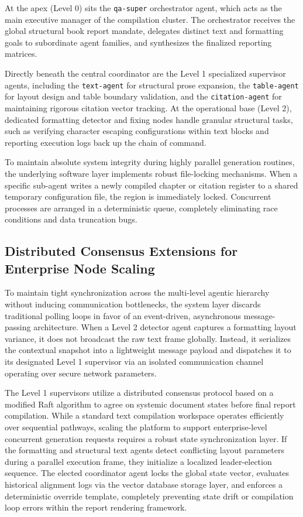 At the apex (Level 0) sits the \texttt{qa-super} orchestrator agent, which acts as the main executive manager of the compilation cluster. The orchestrator receives the global structural book report mandate, delegates distinct text and formatting goals to subordinate agent families, and synthesizes the finalized reporting matrices. 

Directly beneath the central coordinator are the Level 1 specialized supervisor agents, including the \texttt{text-agent} for structural prose expansion, the \texttt{table-agent} for layout design and table boundary validation, and the \texttt{citation-agent} for maintaining rigorous citation vector tracking. At the operational base (Level 2), dedicated formatting detector and fixing nodes handle granular structural tasks, such as verifying character escaping configurations within text blocks and reporting execution logs back up the chain of command.

To maintain absolute system integrity during highly parallel generation routines, the underlying software layer implements robust file-locking mechanisms. When a specific sub-agent writes a newly compiled chapter or citation register to a shared temporary configuration file, the region is immediately locked. Concurrent processes are arranged in a deterministic queue, completely eliminating race conditions and data truncation bugs.

\subsection{Distributed Consensus Extensions for Enterprise Node Scaling}
To maintain tight synchronization across the multi-level agentic hierarchy without inducing communication bottlenecks, the system layer discards traditional polling loops in favor of an event-driven, asynchronous message-passing architecture. When a Level 2 detector agent captures a formatting layout variance, it does not broadcast the raw text frame globally. Instead, it serializes the contextual snapshot into a lightweight message payload and dispatches it to its designated Level 1 supervisor via an isolated communication channel operating over secure network parameters.

The Level 1 supervisors utilize a distributed consensus protocol based on a modified Raft algorithm to agree on systemic document states before final report compilation. While a standard text compilation workspace operates efficiently over sequential pathways, scaling the platform to support enterprise-level concurrent generation requests requires a robust state synchronization layer. If the formatting and structural text agents detect conflicting layout parameters during a parallel execution frame, they initialize a localized leader-election sequence. The elected coordinator agent locks the global state vector, evaluates historical alignment logs via the vector database storage layer, and enforces a deterministic override template, completely preventing state drift or compilation loop errors within the report rendering framework.

